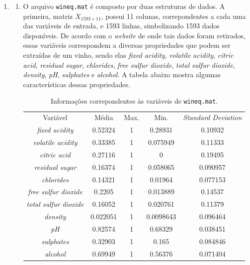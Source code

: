 \begin{enumerate}
		\item \begin{enumerate}
		  \item O arquivo \texttt{wineq.mat} é composto por duas estruturas de dados.
		  A primeira, matriz \(X_{1593 \times 11}\), possui 11 colunas, correpondentes
		  a cada uma das variáveis de entrada, e 1593 linhas, simbolizando 1593 dados
		  disponíveis. De acordo com o \textit{website} de onde tais dados foram
		  retirados, essas variáveis correspondem a diversas propriedades que podem
		  ser extraídas de um vinho, sendo elas \textit{fixed acidity},
		  \textit{volatile acidity}, \textit{citric acid}, \textit{residual sugar},
		  \textit{chlorides}, \textit{free sulfur dioxide}, \textit{total sulfur
		  dioxide}, \textit{density}, \textit{pH}, \textit{sulphates} e
		  \textit{alcohol}. A tabela abaixo mostra algumas características dessas
		  propriedades.
		  
		  \begin{table}[H]
			    \centering
				\footnotesize
				\caption{\label{tab:wineq.mat} Informações correpondentes às variáveis de
				\texttt{wineq.mat}.}
				\begin{tabular}{| c | c |  c | c | c |}
				
				\hline
				Variável & Média & Max. & Min. & \textit{Standard Deviation} \\ \hhline{|=|=|=|=|=|} 
				\textit{fixed acidity} & 0.52324 & 1 & 0.28931 &
				0.10932 \\ \hline \textit{volatile acidity} & 0.33385 & 1 & 0.075949 & 0.11333 \\ \hline
				 \textit{citric acid} & 0.27116 & 1 & 0 & 0.19495 \\ \hline
				 \textit{residual sugar} & 0.16374 & 1 & 0.058065 & 0.090957 \\ \hline
				 \textit{chlorides} & 0.14321 & 1 & 0.01964 & 0.077153 \\ \hline
				 \textit{free sulfur dioxide} & 0.2205 & 1 & 0.013889 & 0.14537 \\ \hline
				 \textit{total sulfur dioxide}& 0.16052 & 1 & 0.020761 & 0.11379 \\ \hline
				 \textit{density} & 0.022051 & 1 & 0.0098643 & 0.096464 \\ \hline
				  \textit{pH} & 0.82574 & 1 & 0.68329 & 0.038451 \\ \hline
				 \textit{sulphates}& 0.32903 & 1 & 0.165 & 0.084846 \\ \hline
				 \textit{alcohol} & 0.69949 & 1 & 0.56376 & 0.071404 \\ \hline
				

\end{tabular}
\end{table}
\end{enumerate}
\end{enumerate}
